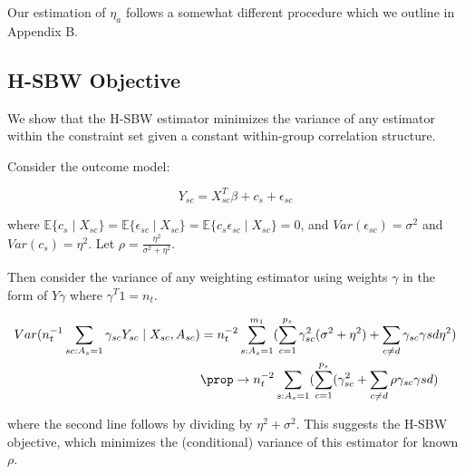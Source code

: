 Our estimation of $\eta_a$ follows a somewhat different procedure which we outline in Appendix B.

\subsection{H-SBW Objective}

We show that the H-SBW estimator minimizes the variance of any estimator within the constraint set given a constant within-group correlation structure.

Consider the outcome model:

\begin{equation}
    Y_{sc} = X_{sc}^T\beta + c_s + \epsilon_{sc}
\end{equation}

where $\mathbb{E}\{c_s \mid X_{sc}\} = \mathbb{E}\{\epsilon_{sc} \mid X_{sc}\} = \mathbb{E}\{c_s\epsilon_{sc} \mid X_{sc}\} = 0$, and $Var(\epsilon_{sc}) = \sigma^2$ and $Var(c_s) = \eta^2$. Let $\rho = \frac{\eta^2}{\sigma^2 + \eta^2}$.

Then consider the variance of any weighting estimator using weights $\gamma$ in the form of $Y\gamma$ where $\gamma^T1 = n_t$.

\begin{align}
    Var(n_t^{-1}\sum_{sc: A_s = 1}\gamma_{sc}Y_{sc} \mid X_{sc}, A_{sc}) &= n_t^{-2}\sum_{s: A_s = 1}^{m_1}(\sum_{c = 1}^{p_s}\gamma_{sc}^2(\sigma^2 + \eta^2) + \sum_{c \ne d}\gamma_{sc}\gamma{sd}\eta^2) \\
    &\prop\to n_t^{-2}\sum_{s: A_s = 1}(\sum_{c = 1}^{p_s}(\gamma_{sc}^2 + \sum_{c \ne d}\rho \gamma_{sc}\gamma{sd})
\end{align}

where the second line follows by dividing by $\eta^2 + \sigma^2$. This suggests the H-SBW objective, which minimizes the (conditional) variance of this estimator for known $\rho$.
